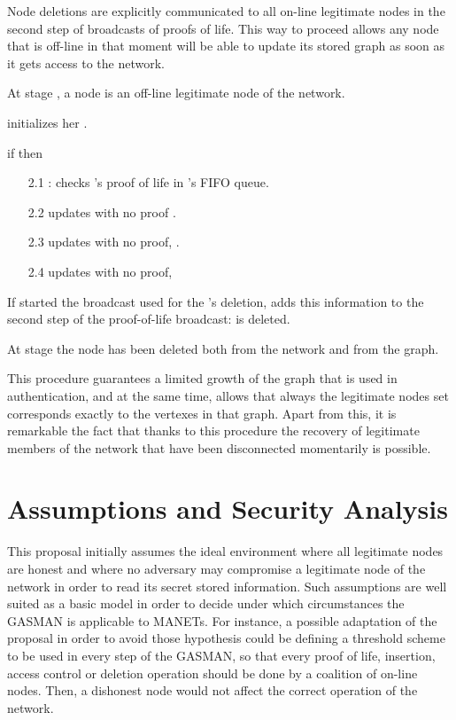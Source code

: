 \documentclass[conference]{IEEEtran}
\begin{document}
Node deletions are explicitly communicated to all on-line
legitimate nodes in the second step of broadcasts of proofs of
life. This way to proceed allows any node that is off-line in that moment will
be able to update its stored graph as soon as it gets access to
the network.


\begin{description}


\item [Input:] At stage , a node  is an off-line legitimate node of the network.
\item [1.]  initializes her .
    \item [2.] if  then
    \begin{enumerate}
    \item [2.1] :  checks 's proof of life in 's FIFO queue.
    \item [2.2]  updates  with no proof .
    \item [2.3]  updates 
    with no proof, .
    \item [2.4]  updates 
        with no proof, 
    \end{enumerate}
    \item [3.]  If  started the broadcast used for the 's deletion,  adds this information
    to the second step of the proof-of-life broadcast:    is deleted.
\item [Output:]  At stage  the node  has been deleted both from the network and from the graph.
\end{description}


This procedure guarantees a limited growth of the graph that
is used in authentication, and at the same time, allows that
always the legitimate nodes set corresponds exactly to the
vertexes in that graph. Apart from this, it is remarkable the fact
that thanks to this procedure  the recovery of legitimate members
of the network that have been disconnected momentarily is possible.

\section{Assumptions and Security Analysis}
\label{AssumptionsasnSecurity}
This proposal initially assumes the ideal environment where all
legitimate nodes are honest and where no adversary may compromise
a legitimate node of the network in order to read its secret
stored information. Such assumptions are well suited as a basic
model in order to decide under which circumstances the GASMAN is applicable to MANETs. For instance, a possible adaptation of the proposal in order to avoid those
hypothesis could be defining a threshold scheme to be used in every step of the GASMAN, so that every proof of life, insertion, access control or deletion operation should be done by a coalition of on-line nodes. Then, a dishonest node would not affect
the correct operation of the network.
\end{document}
